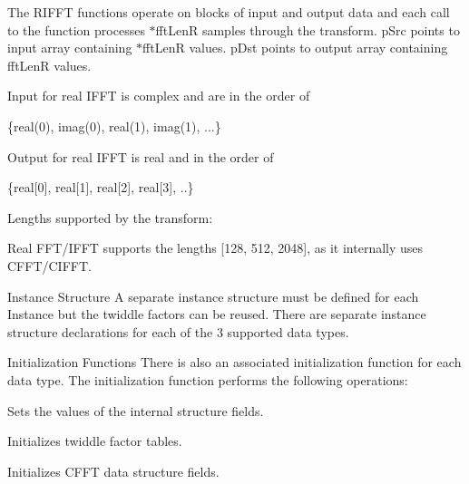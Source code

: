 \begin{DoxyParagraph}{}
 
\end{DoxyParagraph}
\begin{DoxyParagraph}{}
The R\-I\-F\-F\-T functions operate on blocks of input and output data and each call to the function processes {$\ast$fft\-Len\-R} samples through the transform. {\ttfamily p\-Src} points to input array containing {$\ast$fft\-Len\-R} values. {\ttfamily p\-Dst} points to output array containing {\ttfamily fft\-Len\-R} values. \par
 Input for real I\-F\-F\-T is complex and are in the order of 
\begin{DoxyPre}\{real(0), imag(0), real(1), imag(1), ...\}\end{DoxyPre}
 Output for real I\-F\-F\-T is real and in the order of 
\begin{DoxyPre}\{real[0], real[1], real[2], real[3], ..\}\end{DoxyPre}

\end{DoxyParagraph}
\begin{DoxyParagraph}{Lengths supported by the transform\-: }

\end{DoxyParagraph}
\begin{DoxyParagraph}{}
Real F\-F\-T/\-I\-F\-F\-T supports the lengths \mbox{[}128, 512, 2048\mbox{]}, as it internally uses C\-F\-F\-T/\-C\-I\-F\-F\-T.
\end{DoxyParagraph}
\begin{DoxyParagraph}{Instance Structure }
A separate instance structure must be defined for each Instance but the twiddle factors can be reused. There are separate instance structure declarations for each of the 3 supported data types.
\end{DoxyParagraph}
\begin{DoxyParagraph}{Initialization Functions }
There is also an associated initialization function for each data type. The initialization function performs the following operations\-:
\begin{DoxyItemize}
\item Sets the values of the internal structure fields.
\item Initializes twiddle factor tables.
\item Initializes C\-F\-F\-T data structure fields. 
\end{DoxyItemize}
\end{DoxyParagraph}
